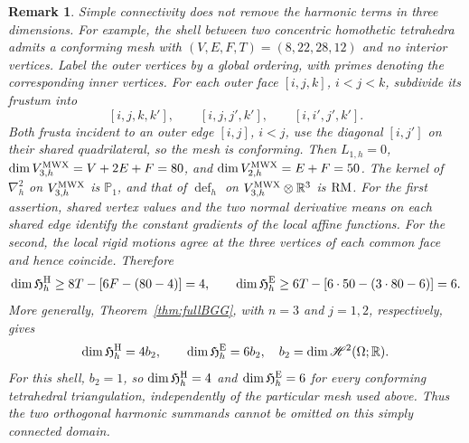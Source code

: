 \documentclass[10pt]{amsart}
\numberwithin{equation}{section}
\newtheorem{remark}[theorem]{Remark}
\newcommand{\defm}{\operatorname{def}}
\begin{document}
\begin{remark}\rm
Simple connectivity does not remove the harmonic terms in three dimensions.
For example, the shell between two concentric homothetic tetrahedra admits a
conforming mesh with $(V,E,F,T)=(8,22,28,12)$ and no interior vertices.
Label the outer vertices by a global ordering, with primes denoting
the corresponding inner vertices. For each outer face $[i,j,k]$,
$i<j<k$, subdivide its frustum into
\[
[i,j,k,k'],\qquad [i,j,j',k'],\qquad [i,i',j',k'].
\]
Both frusta incident to an outer edge $[i,j]$, $i<j$, use the diagonal
$[i,j']$ on their shared quadrilateral, so the mesh is conforming.
Then $L_{1,h}=0$,
$\dim V_{3,h}^{\rm MWX}=V+2E+F=80$, and
$\dim V_{2,h}^{\rm MWX}=E+F=50$.
The kernel of $\nabla_h^2$ on $V_{3,h}^{\rm MWX}$ is $\mathbb P_1$,
and that of $\defm_h$ on $V_{3,h}^{\rm MWX}\otimes\mathbb R^3$ is ${\rm RM}$.
For the first assertion, shared vertex values and the two normal derivative
means on each shared edge identify the constant gradients of the local affine
functions. For the second, the local rigid motions agree at the three vertices
of each common face and hence coincide. Therefore
\[
\dim\mathfrak H_h^{\rm H}\geq 8T-[6F-(80-4)]=4,\qquad
\dim\mathfrak H_h^{\rm E}\geq 6T-[6\cdot50-(3\cdot80-6)]=6.
\]
More generally, Theorem~\ref{thm:fullBGG}, with $n=3$ and
$j=1,2$, respectively, gives
\[
\dim\mathfrak H_h^{\rm H}=4b_2,\qquad
\dim\mathfrak H_h^{\rm E}=6b_2,
\quad b_2=\dim \mathscr H^2(\Omega;\mathbb R).
\]
For this shell, $b_2=1$, so
$\dim\mathfrak H_h^{\rm H}=4$ and $\dim\mathfrak H_h^{\rm E}=6$
for every conforming tetrahedral triangulation, independently of the
particular mesh used above. Thus the two orthogonal harmonic summands
cannot be omitted on this simply connected domain.
\end{remark}
\end{document}
